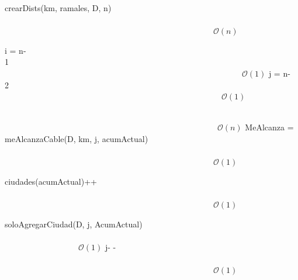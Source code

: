 \documentclass[spanish,a4paper]{article}
\begin{document}
\begin{algorithm}[H]
\begin{algorithmic}

    \STATE crearDists(km, ramales, D, n) \ \ \ \ \ \ \ \ \ \ \ \ \ \ \ \ \ \ \ \ \ \ \ \ \ \ \ \ \ \ \ \ \ \ \ \ \ \ \ \ \ \ \ \ \ \ \ \ \ \ \ \ \ \ \ \ \ \ \ \ \ \ \ \ \ \ \ \ \ \ \ \ \ \ \ \ \ \ \ \ \ \ \ \ \ \ \ \ \ \ \ \ \ \ \ \ \ \ \ \ \ \ \ \ \ \ \ \ \ \ \ \ \ \ \ \ \ \ \ \ \ \ \ $\mathcal{O}(n)$

    \STATE i = n-1\ \ \ \ \ \ \ \ \ \ \ \ \ \ \ \ \ \ \ \ \ \ \ \ \ \ \ \ \ \ \ \ \ \ \ \ \ \ \ \ \ \ \ \ \ \ \ \ \ \ \ \ \ \ \ \ \ \ \ \ \ \ \ \ \ \ \ \ \ \ \ \ \ \ \ \ \ \ \ \ \ \ \ \ \ \ \ \ \ \ \ \ \ \ \ \ \ \ \ \ \ \ \ \ \ \ \ \ \ \ \ \ \ \ \ \ \ \ \ \ \ \ \ \ \ \ \ \ \  $\mathcal{O}(1)$
    \STATE j = n-2\ \ \ \ \ \ \ \ \ \ \ \ \ \ \ \ \ \ \ \ \ \ \ \ \ \ \ \ \ \ \ \ \ \ \ \ \ \ \ \ \ \ \ \ \ \ \ \ \ \ \ \ \ \ \ \ \ \ \ \ \ \ \ \ \ \ \ \ \ \ \ \ \ \ \ \ \ \ \ \ \ \ \ \ \ \ \ \ \ \ \ \ \ \ \ \ \ \ \ \ \ \ \ \ \ \ \ \ \ \ \ \ \ \ \ \ \ \ \ \ \ \ \ \ $\mathcal{O}(1)$

    \STATE \ \ \ \ \ \ \ \ \ \ \ \ \ \ \ \ \ \ \ \ \ \ \ \ \ \ \ \ \ \ \ \ \ \ \ \ \ \ \ \ \ \ \ \ \ \ \ \ \ \ \ \ \ \ \ \ \ \ \ \ \ \ \ \ \ \ \ \ \ \ \ \ \ \ \ \ \ \ \ \ \ \ \ \ \ \ \ \ \ \ \ \ \ \ \ \ \ \ \ \ \ \ \ \ \ \ \ \ \ \ \ \ \ \ \ \ \ \ \ \ \ \ \ \ $\mathcal{O}(n)$
    \STATE MeAlcanza = meAlcanzaCable(D, km, j, acumActual) \ \ \ \ \ \ \ \ \ \ \ \ \ \ \ \ \ \ \ \ \ \ \ \ \ \ \ \ \ \ \ \ \ \ \ \ \ \ \ \ \ \ \ \ \ \ \ \ \ \ \ \ \ \ \ \ \ \ \ \ \ \ \ \ \ \ \ \ \ \ \ \ \ \ \ \ \ \ \ \ \ \ \ \ \ \ \ \ \ \ \ \ \ \ \ \ \ \ \ \ \ \ \ \ \ \ \ \ \ \ \ \ \ \ \ \ \ \ \ \ \ \ \ $\mathcal{O}(1)$
    
    
    \STATE ciudades(acumActual)++ \ \ \ \ \ \ \ \ \ \ \ \ \ \ \ \ \ \ \ \ \ \ \ \ \ \ \ \ \ \ \ \ \ \ \ \ \ \ \ \ \ \ \ \ \ \ \ \ \ \ \ \ \ \ \ \ \ \ \ \ \ \ \ \ \ \ \ \ \ \ \ \ \ \ \ \ \ \ \ \ \ \ \ \ \ \ \ \ \ \ \ \ \ \ \ \ \ \ \ \ \ \ \ \ \ \ \ \ \ \ \ \ \ \ \ \ \ \ \ \ \ \ \ $\mathcal{O}(1)$
    \ENDIF
    
    \STATE soloAgregarCiudad(D, j, AcumActual) \ \ \ \ \ \ \ \ \ \ \ \ \ \ \ \ \ \ \ \ \ \ \ \ \ \ \ \ \ \ \ \ \ \ \ \ \ \ \ \ \ \ \ \ \ \ \ \ \ \ \ \ \ \ \ \ \ \ \ \ \ \ \ \ \ \ \ \ \ \ \ \ \ \ \ \ \ \ \ \ \ \ \ \ \ \ \ \ \ \ $\mathcal{O}(1)$
    \STATE j- - \ \ \ \ \ \ \ \ \ \ \ \ \ \ \ \ \ \ \ \ \ \ \ \ \ \ \ \ \ \ \ \ \ \ \ \ \ \ \ \ \ \ \ \ \ \ \ \ \ \ \ \ \ \ \ \ \ \ \ \ \ \ \ \ \ \ \ \ \ \ \ \ \ \ \ \ \ \ \ \ \ \ \ \ \ \ \ \ \ \ \ \ \ \ \ \ \ \ \ \ \ \ \ \ \ \ \ \ \ \ \ \ \ \ \ \ \ \ \ \ \ \ \ $\mathcal{O}(1)$
    

\end{algorithmic}
\end{algorithm}
\end{document}
